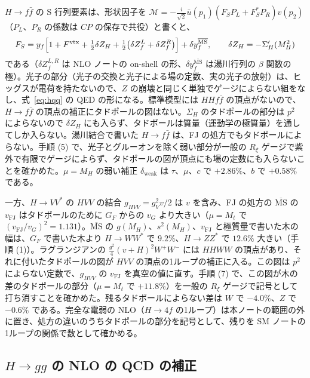 \documentclass[a4paper,10pt]{ltjsarticle}
\newcommand{\MSbar}{\overline{\mathrm{MS}}}
\begin{document}
$H\to f\bar f$ の S 行列要素は、形状因子を $\mathcal M=-\frac i{\sqrt2}\bar u(p_1)(F_SP_L+F_S^*P_R)v(p_2)$（$P_L$、$P_R$ の係数は $CP$ の保存で共役）と書くと、
\begin{equation}
F_S=y_f\Bigl[1+F^{\mathrm{vtx}}+\tfrac12\delta Z_H+\tfrac12\bigl(\delta Z^L_f+\delta Z^R_f\bigr)\Bigr]+\delta y_f^{\MSbar},\qquad \delta Z_H=-\Sigma_H'(M_H^2)
\label{eq:hffren}
\end{equation}
である（$\delta Z^{L,R}_f$ は NLO ノートの on-shell の形、$\delta y_f^{\MSbar}$ は湯川行列の $\beta$ 関数の極）。光子の部分（光子の交換と光子による場の定数、実の光子の放射）は、ヒッグスが電荷を持たないので、$Z$ の崩壊と同じく単独でゲージによらない組をなし、式~\eqref{eq:hqq} の QED の形になる。標準模型には $HHf\bar f$ の頂点がないので、$H\to f\bar f$ の頂点の補正にタドポールの図はない。$\Sigma_H$ のタドポールの部分は $p^2$ によらないので $\delta Z_H$ にも入らず、タドポールは質量（運動学の極質量）を通してしか入らない。湯川結合で書いた $H\to f\bar f$ は、FJ の処方でもタドポールによらない。手順 (5) で、光子とグルーオンを除く弱い部分が一般の $R_\xi$ ゲージで紫外で有限でゲージによらず、タドポールの図が頂点にも場の定数にも入らないことを確かめた。$\mu=M_H$ の弱い補正 $\delta_{\mathrm{weak}}$ は $\tau$、$\mu$、$c$ で $+2.86\%$、$b$ で $+0.58\%$ である。

一方、$H\to VV^*$ の $HVV$ の結合 $g_{HVV}=g_V^2v/2$ は $v$ を含み、FJ の処方の $\MSbar$ の $v_{\mathrm{FJ}}$ はタドポールのために $G_F$ からの $v_G$ より大きい（$\mu=M_t$ で $(v_{\mathrm{FJ}}/v_G)^2=1.131$）。$\MSbar$ の $g(M_H)$、$s^2(M_H)$、$v_{\mathrm{FJ}}$ と極質量で書いた木の幅は、$G_F$ で書いた木より $H\to WW^*$ で $9.2\%$、$H\to ZZ^*$ で $12.6\%$ 大きい（手順 (1)）。ラグランジアンの $\frac{g^2}4(v+H)^2W^+W^-$ には $HHWW$ の頂点があり、それに付いたタドポールの図が $HVV$ の頂点の1ループの補正に入る。この図は $p^2$ によらない定数で、$g_{HVV}$ の $v_{\mathrm{FJ}}$ を真空の値に直す。手順 (7) で、この図が木の差のタドポールの部分（$\mu=M_t$ で $+11.8\%$）を一般の $R_\xi$ ゲージで記号として打ち消すことを確かめた。残るタドポールによらない差は $W$ で $-4.0\%$、$Z$ で $-0.6\%$ である。完全な電弱の NLO（$H\to4f$ の1ループ）は本ノートの範囲の外に置き、処方の違いのうちタドポールの部分を記号として、残りを SM ノートの1ループの関係で数として確かめる。

\subsection{$H\to gg$ の NLO の QCD の補正}\label{sec:hgg}
\end{document}

